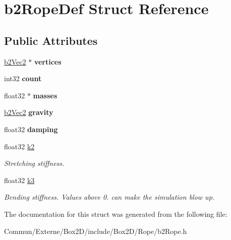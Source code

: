 \hypertarget{structb2_rope_def}{}\section{b2\+Rope\+Def Struct Reference}
\label{structb2_rope_def}
\subsection*{Public Attributes}
\begin{DoxyCompactItemize}
\item 
\hyperlink{structb2_vec2}{b2\+Vec2} $\ast$ {\bfseries vertices}\hypertarget{structb2_rope_def_ae18ad98b9796c505ae62ce58fa2f7051}{}\label{structb2_rope_def_ae18ad98b9796c505ae62ce58fa2f7051}

\item 
int32 {\bfseries count}\hypertarget{structb2_rope_def_a0c75d4289a807e31f32dc43a2276671f}{}\label{structb2_rope_def_a0c75d4289a807e31f32dc43a2276671f}

\item 
float32 $\ast$ {\bfseries masses}\hypertarget{structb2_rope_def_a78f75cce30ee253062ffa6f5462b36a1}{}\label{structb2_rope_def_a78f75cce30ee253062ffa6f5462b36a1}

\item 
\hyperlink{structb2_vec2}{b2\+Vec2} {\bfseries gravity}\hypertarget{structb2_rope_def_a90d98969150047662ce835ec1670fb32}{}\label{structb2_rope_def_a90d98969150047662ce835ec1670fb32}

\item 
float32 {\bfseries damping}\hypertarget{structb2_rope_def_a13ad872bb9d4926f3e4e49b7061613cb}{}\label{structb2_rope_def_a13ad872bb9d4926f3e4e49b7061613cb}

\item 
float32 \hyperlink{structb2_rope_def_a89de5d2c15afacd41722c76523e33826}{k2}\hypertarget{structb2_rope_def_a89de5d2c15afacd41722c76523e33826}{}\label{structb2_rope_def_a89de5d2c15afacd41722c76523e33826}

\begin{DoxyCompactList}\small\item\em Stretching stiffness. \end{DoxyCompactList}\item 
float32 \hyperlink{structb2_rope_def_a3f4749e0a309b53daf804c75adfb4ba8}{k3}\hypertarget{structb2_rope_def_a3f4749e0a309b53daf804c75adfb4ba8}{}\label{structb2_rope_def_a3f4749e0a309b53daf804c75adfb4ba8}

\begin{DoxyCompactList}\small\item\em Bending stiffness. Values above 0. can make the simulation blow up. \end{DoxyCompactList}\end{DoxyCompactItemize}


The documentation for this struct was generated from the following file\+:\begin{DoxyCompactItemize}
\item 
Commun/\+Externe/\+Box2\+D/include/\+Box2\+D/\+Rope/b2\+Rope.\+h\end{DoxyCompactItemize}
